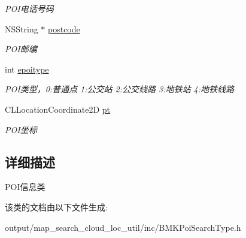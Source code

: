 \begin{DoxyCompactItemize}
\begin{DoxyCompactList}\small\item\em P\+O\+I电话号码 \end{DoxyCompactList}\item 
\hypertarget{interface_b_m_k_poi_info_a696c50cfef411e4c8aa4a53693c26dc5}{N\+S\+String $\ast$ \hyperlink{interface_b_m_k_poi_info_a696c50cfef411e4c8aa4a53693c26dc5}{postcode}}\label{interface_b_m_k_poi_info_a696c50cfef411e4c8aa4a53693c26dc5}

\begin{DoxyCompactList}\small\item\em P\+O\+I邮编 \end{DoxyCompactList}\item 
\hypertarget{interface_b_m_k_poi_info_ada3ccb40708069fe5d82414af8de1ab5}{int \hyperlink{interface_b_m_k_poi_info_ada3ccb40708069fe5d82414af8de1ab5}{epoitype}}\label{interface_b_m_k_poi_info_ada3ccb40708069fe5d82414af8de1ab5}

\begin{DoxyCompactList}\small\item\em P\+O\+I类型，0\+:普通点 1\+:公交站 2\+:公交线路 3\+:地铁站 4\+:地铁线路 \end{DoxyCompactList}\item 
\hypertarget{interface_b_m_k_poi_info_a6ace0b9f9462c1695317654d92c3795a}{C\+L\+Location\+Coordinate2\+D \hyperlink{interface_b_m_k_poi_info_a6ace0b9f9462c1695317654d92c3795a}{pt}}\label{interface_b_m_k_poi_info_a6ace0b9f9462c1695317654d92c3795a}

\begin{DoxyCompactList}\small\item\em P\+O\+I坐标 \end{DoxyCompactList}\end{DoxyCompactItemize}


\subsection{详细描述}
P\+O\+I信息类 

该类的文档由以下文件生成\+:\begin{DoxyCompactItemize}
\item 
output/map\+\_\+search\+\_\+cloud\+\_\+loc\+\_\+util/inc/B\+M\+K\+Poi\+Search\+Type.\+h\end{DoxyCompactItemize}
